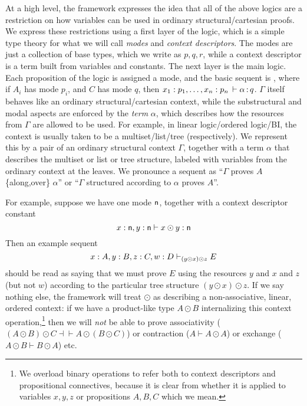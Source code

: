 At a high level, the framework expresses the idea that all of the above
logics are a restriction on how variables can be used in ordinary
structural/cartesian proofs.  We express these restrictions using a
first layer of the logic, which is a simple type theory for what we will
call \emph{modes} and \emph{context descriptors}.  The modes are just a
collection of base types, which we write as $p,q,r$, while a context
descriptor is a term built from variables and constants.  The next layer
is the main logic.  Each proposition of the logic is assigned a mode,
and the basic sequent is ,
where if $A_i$ has mode $p_i$, and $C$ has mode $q$, then $x_1 :
  p_1,\ldots, x_n : p_n \, \vdash \alpha \, \mathit{:} \, q$.  
$\Gamma$ itself behaves like an ordinary structural/cartesian context,
while the substructural and modal aspects are enforced by the
\emph{term} $\alpha$, which describes how the resources from $\Gamma$
are allowed to be used.  For example, in linear logic/ordered logic/BI,
the context is usually taken to be a multiset/list/tree (respectively).
We represent this by a pair of an ordinary structural context $\Gamma$,
together with a term $\alpha$ that describes the multiset or list or
tree structure, labeled with variables from the ordinary context at the
leaves.  We pronounce a sequent  as ``$\Gamma$
proves $A$ \{along,over\} $\alpha$'' or ``$\Gamma$ structured according to
$\alpha$ proves $A$''.

For example, suppose we have one mode $\mathsf{n}$, together with a context
descriptor constant
\[
x : \mathsf{n}, y:\mathsf{n} \vdash x \odot y : \mathsf{n}
\]
Then an example sequent
\[
x:A, y:B, z:C, w:D \vdash_{(y \odot x) \odot z} E
\]
should be read as saying that we must prove $E$ using the resources $y$
and $x$ and $z$ (but not $w$) according to the particular tree structure
${(y \odot x) \odot z}$.  If we say nothing else, the framework will
treat $\odot$ as describing a non-associative, linear, ordered context:
if we have a product-like type $A \odot B$ internalizing this context
operation,\footnote{We overload binary operations to refer both to
  context descriptors and propositional connectives, because it is clear
  from whether it is applied to variables $x,y,z$ or propositions
  $A,B,C$ which we mean.}  then we will \emph{not} be able to prove
associativity ($(A \odot B) \odot C \dashv\vdash A \odot (B \odot C)$)
or contraction ($A \vdash A \odot A$) or exchange ($A \odot B \vdash B
\odot A$) etc.

